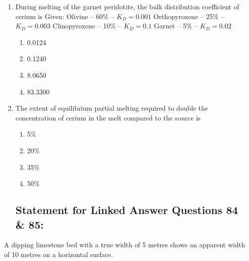 \documentclass[journal,12pt,onecolumn]{IEEEtran}
\theoremstyle{remark}
\begin{document}
\begin{enumerate}[resume]

\item During melting of the garnet peridotite, the bulk distribution coefficient of cerium is  
Given:  
Olivine -- 60\% -- $K_D = 0.001$  
Orthopyroxene -- 25\% -- $K_D = 0.003$  
Clinopyroxene -- 10\% -- $K_D = 0.1$  
Garnet -- 5\% -- $K_D = 0.02$

\begin{multicols}{4}
\begin{enumerate}
\item 0.0124  
\item 0.1240  
\item 8.0650  
\item 83.3300  
\end{enumerate}
\end{multicols}
\vspace{0.5cm}

\item The extent of equilibrium partial melting required to double the concentration of cerium in the melt compared to the source is

\begin{multicols}{4}
\begin{enumerate}
\item 5\%  
\item 20\%  
\item 35\%  
\item 50\%  
\end{enumerate}
\end{multicols}
\vspace{0.5cm}

\subsection*{Statement for Linked Answer Questions 84 \& 85:}
\end{enumerate}
\vspace{0.5cm}
A dipping limestone bed with a true width of 5 metres shows an apparent width of 10 metres on a horizontal surface.
\end{document}
